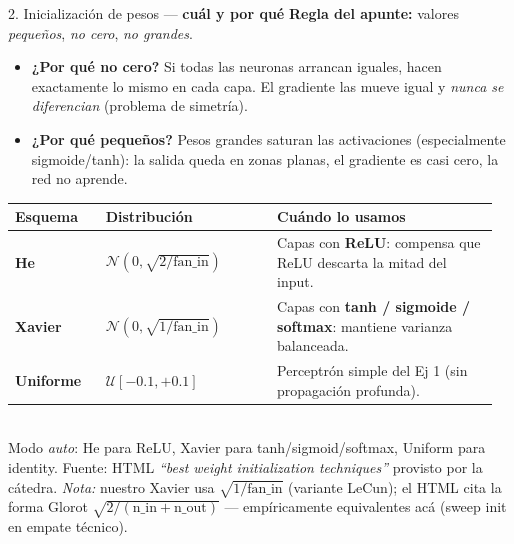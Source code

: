 \documentclass[11pt,aspectratio=169]{beamer}
\begin{document}
\begin{frame}{2. Inicialización de pesos — \textbf{cuál y por qué}}
\textbf{Regla del apunte:} valores \emph{pequeños}, \emph{no cero}, \emph{no grandes}.\\[0.5em]

\begin{itemize}\setlength\itemsep{0.2em}\small
  \item \textbf{¿Por qué no cero?} Si todas las neuronas arrancan iguales, hacen exactamente lo mismo en cada capa. El gradiente las mueve igual y \emph{nunca se diferencian} (problema de simetría).
  \item \textbf{¿Por qué pequeños?} Pesos grandes saturan las activaciones (especialmente sigmoide/tanh): la salida queda en zonas planas, el gradiente es casi cero, la red no aprende.
\end{itemize}
\vspace{0.6em}

\centering\small
\begin{tabular}{@{}p{0.18\linewidth}p{0.34\linewidth}p{0.44\linewidth}@{}}
\toprule
\textbf{Esquema} & \textbf{Distribución} & \textbf{Cuándo lo usamos} \\
\midrule
\textbf{He}      & $\mathcal{N}\!\left(0, \sqrt{2/\text{fan\_in}}\right)$ & Capas con \textbf{ReLU}: compensa que ReLU descarta la mitad del input. \\
\textbf{Xavier}  & $\mathcal{N}\!\left(0, \sqrt{1/\text{fan\_in}}\right)$ & Capas con \textbf{tanh / sigmoide / softmax}: mantiene varianza balanceada. \\
\textbf{Uniforme} & $\mathcal{U}[-0.1, +0.1]$                            & Perceptrón simple del Ej 1 (sin propagación profunda). \\
\bottomrule
\end{tabular}\\[0.4em]

\textcolor{muted}{\footnotesize Modo \emph{auto}: He para ReLU, Xavier para tanh/sigmoid/softmax, Uniform para identity. Fuente: HTML \emph{``best weight initialization techniques''} provisto por la cátedra. \textit{Nota:} nuestro Xavier usa $\sqrt{1/\text{fan\_in}}$ (variante LeCun); el HTML cita la forma Glorot $\sqrt{2/(\text{n\_in}+\text{n\_out})}$ — empíricamente equivalentes acá (sweep init en empate técnico).}
\end{frame}
\end{document}
